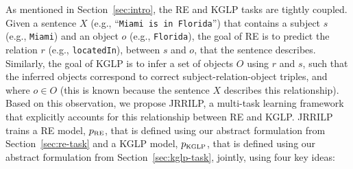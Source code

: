 \label{sec:JRRILP}

As mentioned in Section~\ref{sec:intro}, the RE and KGLP tasks are tightly coupled.
Given a sentence $X$ (e.g., ``\texttt{Miami is in Florida}'') that contains a subject $s$ (e.g., \texttt{Miami}) and an object $o$ (e.g., \texttt{Florida}), the goal of RE is to predict the relation $r$ (e.g., \texttt{locatedIn}), between $s$ and $o$, that the sentence describes. Similarly, the goal of KGLP is to infer a set of objects $O$ using $r$ and $s$, such that the inferred objects correspond to correct subject-relation-object triples, and where $o\in O$ (this is known because the sentence $X$ describes this relationship).
Based on this observation, we propose JRRILP, a multi-task learning framework that explicitly accounts for this relationship between RE and KGLP.
JRRILP trains a RE model, $p_{\textrm{\tiny RE}}$, that is defined using our abstract formulation from Section~\ref{sec:re-task} and a KGLP model, $p_{\textrm{\tiny KGLP}}$, that is defined using our abstract formulation from Section~\ref{sec:kglp-task}, jointly, using four key ideas:
